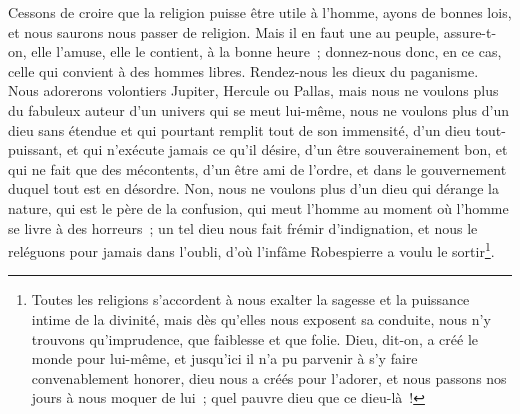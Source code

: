 \documentclass[french,twoside]{book} %
\begin{document}
Cessons de croire que la religion puisse être utile à l’homme, ayons de bonnes lois, et nous saurons nous passer de religion. Mais il en faut une au peuple, assure-t-on, elle l’amuse, elle le contient, à la bonne heure ; donnez-nous donc, en ce cas, celle qui convient à des hommes libres. Rendez-nous les dieux du paganisme. Nous adorerons volontiers Jupiter, Hercule ou Pallas, mais nous ne voulons plus du fabuleux auteur d’un univers qui se meut lui-même, nous ne voulons plus d’un dieu sans étendue et qui pourtant remplit tout de son immensité, d’un dieu tout-puissant, et qui n’exécute jamais ce qu’il désire, d’un être souverainement bon, et qui ne fait que des mécontents, d’un être ami de l’ordre, et dans le gouvernement duquel tout est en désordre. Non, nous ne voulons plus d’un dieu qui dérange la nature, qui est le père de la confusion, qui meut l’homme au moment où l’homme se livre à des horreurs ; un tel dieu nous fait frémir d’indignation, et nous le reléguons pour jamais dans l’oubli, d’où l’infâme Robespierre a voulu le sortir\footnote{ Toutes les religions s’accordent à nous exalter la sagesse et la puissance intime de la divinité, mais dès qu’elles nous exposent sa conduite, nous n’y trouvons qu’imprudence, que faiblesse et que folie. Dieu, dit-on, a créé le monde pour lui-même, et jusqu’ici il n’a pu parvenir à s’y faire convenablement honorer, dieu nous a créés pour l’adorer, et nous passons nos jours à nous moquer de lui ; quel pauvre dieu que ce dieu-là !}.\par
\end{document}
